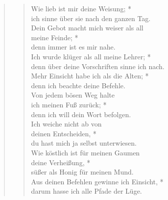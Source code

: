\begin{quote}
\begin{verse}
Wie lieb ist mir deine Weisung; *\\
ich sinne über sie nach den ganzen Tag.\\ \vin 
Dein Gebot macht mich weiser als all \\ \vin meine Feinde; *\\ \vin
denn immer ist es mir nahe.\\
Ich wurde klüger als all meine Lehrer; *\\
denn über deine Vorschriften sinne ich nach.\\ \vin
 Mehr Einsicht habe ich als die Alten; *\\ \vin
denn ich beachte deine Befehle.\\ 
  Von jedem bösen Weg halte\\ ich meinen Fuß zurück; *\\
denn ich will dein Wort befolgen.\\ \vin 
 Ich weiche nicht ab von \\ \vin deinen Entscheiden, *\\ \vin
du hast mich ja selbst unterwiesen.\\
 Wie köstlich ist für meinen Gaumen \\ deine Verheißung, *\\
süßer als Honig für meinen Mund.\\ \vin 
 Aus deinen Befehlen gewinne ich Einsicht, *\\ \vin
darum hasse ich alle Pfade der Lüge.\\                          

\end{verse}
\end{quote} 